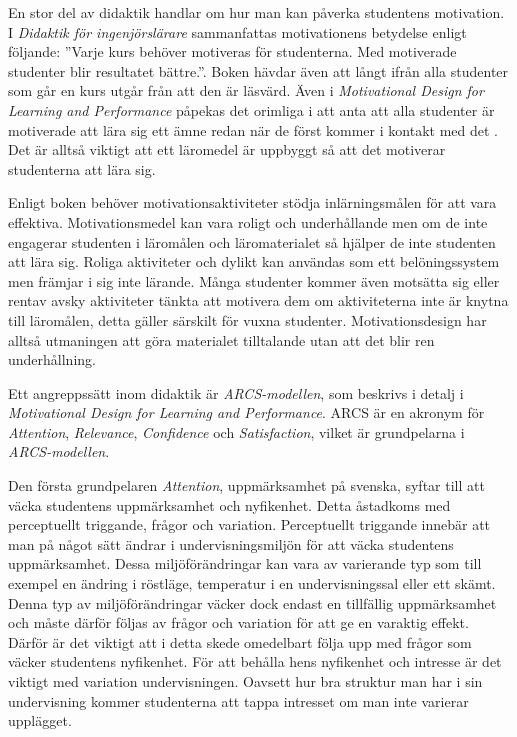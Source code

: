 \documentclass[12pt,a4paper,twoside,openright]{article}
\begin{document}
En stor del av didaktik handlar om hur man kan påverka studentens
motivation. I \textit{Didaktik för ingenjörslärare} sammanfattas
motivationens betydelse enligt följande: ”Varje kurs behöver motiveras
för studenterna. Med motiverade studenter blir resultatet bättre.”.
Boken hävdar även att långt ifrån alla studenter som går en kurs utgår
från att den är läsvärd. Även i \textit{Motivational Design for
 Learning and Performance} påpekas det orimliga i att anta att alla
studenter är motiverade att lära sig ett ämne redan när de först
kommer i kontakt med det \cite{motivational_design}. Det är alltså viktigt att ett läromedel är
uppbyggt så att det motiverar studenterna att lära sig.

Enligt boken%
behöver motivations\-aktiviteter stödja inlärningsmålen för att vara
effektiva. Motivationsmedel kan vara roligt och underhållande men om
de inte engagerar studenten i läromålen och läromaterialet så hjälper
de inte studenten att lära sig. Roliga aktiviteter och dylikt kan
användas som ett belöningssystem men främjar i sig inte lärande. Många
studenter kommer även motsätta sig eller rentav avsky aktiviteter
tänkta att motivera dem om aktiviteterna inte är knytna till
läromålen, detta gäller särskilt för vuxna studenter.
Motivationsdesign har alltså utmaningen att göra materialet
tilltalande utan att det blir ren underhållning.

Ett angreppssätt inom didaktik är \textit{ARCS-modellen}, som beskrivs
i detalj i \textit{Motivational Design for Learning and Performance}.
ARCS är en akronym för \textit{Attention}, \textit{Relevance},
\textit{Confidence} och \textit{Satisfaction}, vilket är grundpelarna
i \textit{ARCS-modellen}.

Den första grundpelaren \textit{Attention}, uppmärksamhet på svenska,
syftar till att väcka studentens uppmärksamhet och nyfikenhet.
Detta åstadkoms med perceptuellt triggande, frågor och variation.
Perceptuellt triggande innebär att man på något sätt ändrar i
undervisningsmiljön för att väcka studentens uppmärksamhet. Dessa
miljöförändringar kan vara av varierande typ som till exempel en
ändring i röstläge, temperatur i en undervisningssal eller ett skämt.
Denna typ av miljöförändringar väcker dock endast en tillfällig
uppmärksamhet och måste därför följas av frågor och variation för att
ge en varaktig effekt. Därför är det viktigt att i detta skede
omedelbart följa upp med frågor som väcker studentens nyfikenhet. För
att behålla hens nyfikenhet och intresse är det viktigt med variation
undervisningen. Oavsett hur bra struktur man har i sin undervisning
kommer studenterna att tappa intresset om man inte varierar upplägget.
\end{document}
